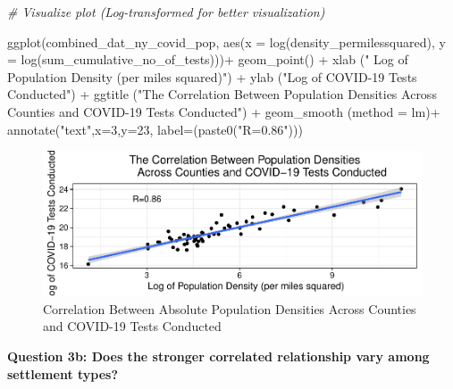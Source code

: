 \documentclass[
  12pt,
]{article}
\newenvironment{Shaded}{\begin{snugshade}}{\end{snugshade}}
\newcommand{\AttributeTok}[1]{\textcolor[rgb]{0.77,0.63,0.00}{#1}}
\newcommand{\CommentTok}[1]{\textcolor[rgb]{0.56,0.35,0.01}{\textit{#1}}}
\newcommand{\DecValTok}[1]{\textcolor[rgb]{0.00,0.00,0.81}{#1}}
\newcommand{\FunctionTok}[1]{\textcolor[rgb]{0.00,0.00,0.00}{#1}}
\newcommand{\NormalTok}[1]{#1}
\newcommand{\SpecialCharTok}[1]{\textcolor[rgb]{0.00,0.00,0.00}{#1}}
\newcommand{\StringTok}[1]{\textcolor[rgb]{0.31,0.60,0.02}{#1}}
\begin{document}
\begin{Shaded}
\begin{Highlighting}[]
\CommentTok{\# Visualize plot (Log{-}transformed for better visualization)}

\FunctionTok{ggplot}\NormalTok{(combined\_dat\_ny\_covid\_pop, }\FunctionTok{aes}\NormalTok{(}\AttributeTok{x =} \FunctionTok{log}\NormalTok{(density\_permilessquared), }\AttributeTok{y =} \FunctionTok{log}\NormalTok{(sum\_cumulative\_no\_of\_tests)))}\SpecialCharTok{+}
  \FunctionTok{geom\_point}\NormalTok{() }\SpecialCharTok{+}
  \FunctionTok{xlab}\NormalTok{ (}\StringTok{" Log of Population Density (per miles squared)"}\NormalTok{) }\SpecialCharTok{+}
  \FunctionTok{ylab}\NormalTok{ (}\StringTok{"Log of COVID{-}19 Tests Conducted"}\NormalTok{) }\SpecialCharTok{+}
  \FunctionTok{ggtitle}\NormalTok{ (}\StringTok{"The Correlation Between Population Densities}
\StringTok{           Across Counties and COVID{-}19 Tests Conducted"}\NormalTok{) }\SpecialCharTok{+}
  \FunctionTok{geom\_smooth}\NormalTok{ (}\AttributeTok{method =} \StringTok{\textquotesingle{}lm\textquotesingle{}}\NormalTok{)}\SpecialCharTok{+}
  \FunctionTok{annotate}\NormalTok{(}\StringTok{"text"}\NormalTok{,}\AttributeTok{x=}\DecValTok{3}\NormalTok{,}\AttributeTok{y=}\DecValTok{23}\NormalTok{, }\AttributeTok{label=}\NormalTok{(}\FunctionTok{paste0}\NormalTok{(}\StringTok{"R=0.86"}\NormalTok{)))}
\end{Highlighting}
\end{Shaded}

\begin{figure}

\includegraphics{EDA_Final_Group_Project_files/figure-latex/unnamed-chunk-28-1} \hfill{}

\caption{Correlation Between Absolute Population Densities Across Counties and COVID-19 Tests Conducted}\label{fig:unnamed-chunk-28}
\end{figure}

\textbf{Question 3b: Does the stronger correlated relationship vary
among settlement types?}
\end{document}
